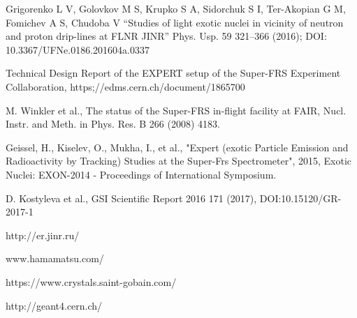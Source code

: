 \documentclass{webofc}
\begin{document}
	
\begin{thebibliography}{99}
	Grigorenko L V, Golovkov M S, Krupko S A, Sidorchuk S I, Ter-Akopian G M, Fomichev A S, Chudoba V “Studies of light exotic nuclei in vicinity of neutron and proton drip-lines at FLNR JINR” Phys. Usp. 59 321–366 (2016); DOI: 10.3367/UFNe.0186.201604a.0337
	
	
	Technical Design Report of the EXPERT setup of the Super-FRS Experiment Collaboration, https;//edms.cern.ch/document/1865700
	
	M. Winkler et al., The status of the Super-FRS in-flight facility at FAIR, Nucl. Instr. and Meth. in Phys. Res. B 266 (2008) 4183.
	
	Geissel, H., Kiselev, O., Mukha, I., et al., "Expert (exotic Particle Emission and Radioactivity by Tracking) Studies at the Super-Frs Spectrometer", 2015, Exotic Nuclei: EXON-2014 - Proceedings of International Symposium.
	
	D. Kostyleva et al., GSI Scientific Report 2016 171 (2017), DOI:10.15120/GR-2017-1
	
	http://er.jinr.ru/
	
	www.hamamatsu.com/
	
	https://www.crystals.saint-gobain.com/
	
	http://geant4.cern.ch/
	
	
\end{thebibliography}
\end{document}

